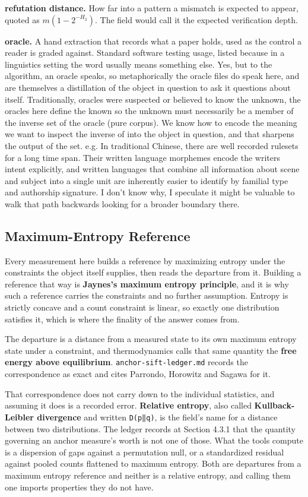 \textbf{refutation distance.} How far into a pattern a mismatch is expected to appear, quoted as \(m(1-2^{-H_2})\). The field would call it the expected verification depth.

\textbf{oracle.} A hand extraction that records what a paper holds, used as the control a reader is graded against. Standard software testing usage, listed because in a linguistics setting the word usually means something else. Yes, but to the algorithm, an oracle speaks, so metaphorically the oracle files do speak here, and are themselves a distillation of the object in question to ask it questions about itself. Traditionally, oracles were suspected or believed to know the unknown, the oracles here define the known so the unknown must necessarily be a member of the inverse set of the oracle (pure corpus). We know how to encode the meaning we want to inspect the inverse of into the object in question, and that sharpens the output of the set. e.g. In traditional Chinese, there are well recorded rulesets for a long time span. Their written language morphemes encode the writers intent explicitly, and written languages that combine all information about scene and subject into a single unit are inherently easier to identify by familial type and authorship signature. I don't know why, I speculate it might be valuable to walk that path backwards looking for a broader boundary there.

\subsection{Maximum-Entropy Reference}

Every measurement here builds a reference by maximizing entropy under the constraints the object itself supplies, then reads the departure from it. Building a reference that way is \textbf{Jaynes's maximum entropy principle}, and it is why such a reference carries the constraints and no further assumption. Entropy is strictly concave and a count constraint is linear, so exactly one distribution satisfies it, which is where the finality of the answer comes from.

The departure is a distance from a measured state to its own maximum entropy state under a constraint, and thermodynamics calls that same quantity the \textbf{free energy above equilibrium}. \texttt{anchor-\allowbreak{}sift-\allowbreak{}ledger.\allowbreak{}md} records the correspondence as exact and cites Parrondo, Horowitz and Sagawa for it.

That correspondence does not carry down to the individual statistics, and assuming it does is a recorded error. \textbf{Relative entropy}, also called \textbf{Kullback-Leibler divergence} and written \texttt{D(p‖q)}, is the field's name for a distance between two distributions. The ledger records at Section 4.3.1 that the quantity governing an anchor measure's worth is not one of those. What the tools compute is a dispersion of gaps against a permutation null, or a standardized residual against pooled counts flattened to maximum entropy. Both are departures from a maximum entropy reference and neither is a relative entropy, and calling them one imports properties they do not have.

